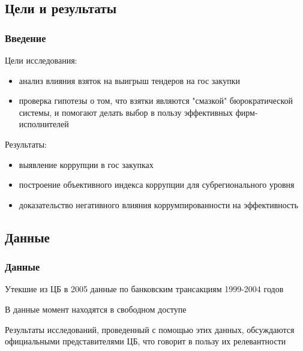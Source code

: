 \subsection{Цели и результаты}

\begin{frame}

\frametitle{Введение}
Цели исследования:\\ 

\begin{itemize}
\item анализ влияния взяток на выигрыш 
тендеров на гос закупки

\item проверка гипотезы о том, 
что взятки являются "смазкой" бюрократической системы, и помогают делать выбор в пользу
эффективных фирм-исполнителей
\end{itemize}

\vspace{5mm}

Результаты:
\begin{itemize}

\item выявление коррупции в гос закупках

\item построение объективного индекса
коррупции для субрегионального уровня

\item доказательство негативного влияния коррумпированности на
эффективность

\end{itemize}

\end{frame}



\subsection{Данные}

\begin{frame}

\frametitle{Данные}
Утекшие из ЦБ в 2005 данные по банковским трансакциям 1999-2004 годов
\vspace{3mm}

В данные момент находятся в свободном доступе

\vspace{3mm}
Результаты исследований, проведенный с помощью этих данных, 
обсуждаются официальными представителями ЦБ,
что говорит в пользу их релевантности

\end{frame}